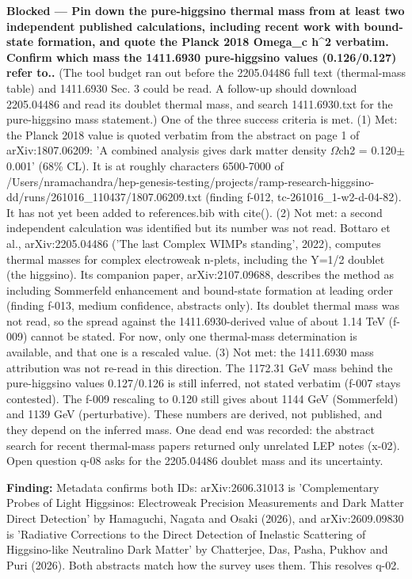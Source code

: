 \documentclass[11pt,a4paper]{article}
\begin{document}
\textbf{Blocked --- Pin down the pure-higgsino thermal mass from at least two independent published calculations, including recent work with bound-state formation, and quote the Planck 2018 Omega\_c h\textasciicircum{}2 verbatim. Confirm which mass the 1411.6930 pure-higgsino values (0.126/0.127) refer to..} (The tool budget ran out before the 2205.04486 full text (thermal-mass table) and 1411.6930 Sec. 3 could be read. A follow-up should download 2205.04486 and read its doublet thermal mass, and search 1411.6930.txt for the pure-higgsino mass statement.) One of the three success criteria is met. (1) Met: the Planck 2018 value is quoted verbatim from the abstract on page 1 of arXiv:1807.06209: 'A combined analysis gives dark matter density $\Omega$ch2 = 0.120$\pm$ 0.001' (68\% CL). It is at roughly characters 6500-7000 of /Users/nramachandra/hep-genesis-testing/projects/ramp-research-higgsino-dd/runs/261016\_110437/1807.06209.txt (finding f-012, tc-261016\_1-w2-d-04-82). It has not yet been added to references.bib with cite(). (2) Not met: a second independent calculation was identified but its number was not read. Bottaro et al., arXiv:2205.04486 ('The last Complex WIMPs standing', 2022), computes thermal masses for complex electroweak n-plets, including the Y=1/2 doublet (the higgsino). Its companion paper, arXiv:2107.09688, describes the method as including Sommerfeld enhancement and bound-state formation at leading order (finding f-013, medium confidence, abstracts only). Its doublet thermal mass was not read, so the spread against the 1411.6930-derived value of about 1.14 TeV (f-009) cannot be stated. For now, only one thermal-mass determination is available, and that one is a rescaled value. (3) Not met: the 1411.6930 mass attribution was not re-read in this direction. The 1172.31 GeV mass behind the pure-higgsino values 0.127/0.126 is still inferred, not stated verbatim (f-007 stays contested). The f-009 rescaling to 0.120 still gives about 1144 GeV (Sommerfeld) and 1139 GeV (perturbative). These numbers are derived, not published, and they depend on the inferred mass. One dead end was recorded: the abstract search for recent thermal-mass papers returned only unrelated LEP notes (x-02). Open question q-08 asks for the 2205.04486 doublet mass and its uncertainty.

\textbf{Finding:} Metadata confirms both IDs: arXiv:2606.31013 is 'Complementary Probes of Light Higgsinos: Electroweak Precision Measurements and Dark Matter Direct Detection' by Hamaguchi, Nagata and Osaki (2026), and arXiv:2609.09830 is 'Radiative Corrections to the Direct Detection of Inelastic Scattering of Higgsino-like Neutralino Dark Matter' by Chatterjee, Das, Pasha, Pukhov and Puri (2026). Both abstracts match how the survey uses them. This resolves q-02.
\end{document}
